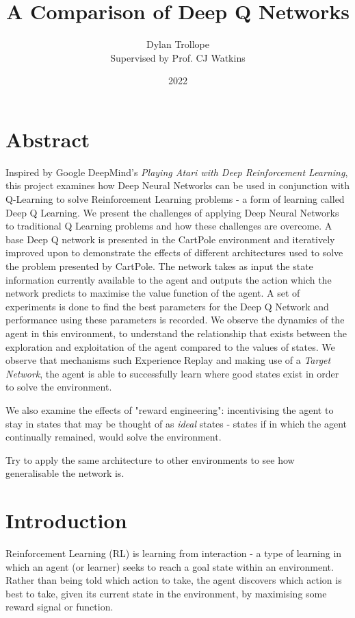 \documentclass{article}
\title{A Comparison of Deep Q Networks}
\author{Dylan Trollope \\\small Supervised by Prof. CJ Watkins}
\date{2022}
\begin{document}
\maketitle

\section{Abstract}

Inspired by Google DeepMind's \textit{Playing Atari with Deep Reinforcement Learning}\cite{mnih2013atari}, this project examines how Deep Neural Networks can be used in conjunction with Q-Learning to solve Reinforcement Learning problems - a form of learning called Deep Q Learning. We present the challenges of applying Deep Neural Networks to traditional Q Learning problems and how these challenges are overcome. A base Deep Q network is presented in the CartPole environment and iteratively improved upon to demonstrate the effects of different architectures used to solve the problem presented by CartPole. The network takes as input the state information currently available to the agent and outputs the action which the network predicts to maximise the value function of the agent. A set of experiments is done to find the best parameters for the Deep Q Network and performance using these parameters is recorded. We observe the dynamics of the agent in this environment, to understand the relationship that exists between the exploration and exploitation of the agent compared to the values of states. We observe that mechanisms such Experience Replay and making use of a \textit{Target Network}, the agent is able to successfully learn where good states exist in order to solve the environment.

We also examine the effects of "reward engineering": incentivising the agent to stay in states that may be thought of as \textit{ideal} states - states if in which the agent continually remained, would solve the environment. 

Try to apply the same architecture to other environments to see how generalisable the network is. 


\newpage
\tableofcontents
\listoftables
\listoffigures
\newpage



\section{Introduction}

Reinforcement Learning (RL) is learning from interaction - a type of learning in which an agent (or learner) seeks to reach a goal state within an environment. Rather than being told which action to take, the agent discovers which action is best to take, given its current state in the environment, by maximising some reward signal or function. 
\end{document}
